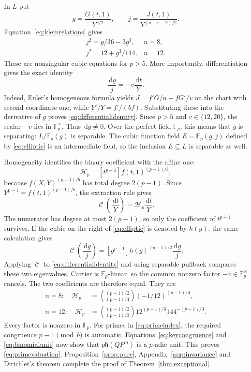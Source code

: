 \documentclass[11pt]{article}
\numberwithin{equation}{section}
\theoremstyle{definition}
\theoremstyle{remark}
\newcommand{\Fp}{\mathbb F_p}
\newcommand{\dd}{\,\mathrm d}
\newcommand{\h}{\mathsf h}
\DeclareMathOperator{\Cart}{\mathcal C}
\begin{document}
In $L$ put
\[
 g=\frac{G(t,1)}{Y^{v/2}},\qquad
 j=\frac{J(t,1)}{Y^{(n+v-2)/2}}.
\]
Equation~\eqref{eq:kleinrelations} gives
\begin{equation}\label{eq:elliptic}
 \begin{array}{ll}
 j^2=g/36-3g^3,&n=8,\\
 j^2=12+g^3/144,&n=12.
 \end{array}
\end{equation}
These are nonsingular cubic equations for $p>5$. More importantly,
differentiation gives the exact identity
\begin{equation}\label{eq:differentialidentity}
 \frac{\dd g}{j}=-v\frac{\dd t}{Y}.
\end{equation}
Indeed, Euler's homogeneous formula yields
$J=f'G/n-fG'/v$ on the chart with second coordinate one, while
$Y'/Y=f'/(bf)$. Substituting these into the derivative of $g$ proves
\eqref{eq:differentialidentity}. Since $p>5$ and $v\in\{12,20\}$,
the scalar $-v$ lies in $\Fp^\times$. Thus $\dd g\ne0$.
Over the perfect field $\Fp$, this means that $g$ is separating:
$L/\Fp(g)$ is separable. The cubic function field
$E=\Fp(g,j)$ defined by \eqref{eq:elliptic} is an intermediate field,
so the inclusion $E\subseteq L$ is separable as well.

Homogeneity identifies the binary coefficient with the affine one:
\[
 \mathcal H_p=[t^{p-1}]f(t,1)^{(p-1)/b},
\]
because $f(X,Y)^{(p-1)/b}$ has total degree $2(p-1)$.
Since $Y^{p-1}=f(t,1)^{(p-1)/b}$, the extraction rule gives
\[
 \Cart\left(\frac{\dd t}{Y}\right)
 =\mathcal H_p\frac{\dd t}{Y}.
\]
The numerator has degree at most $2(p-1)$, so only the coefficient
of $t^{p-1}$ survives. If the cubic on the right of
\eqref{eq:elliptic} is denoted by $h(g)$, the same calculation gives
\[
 \Cart\left(\frac{\dd g}{j}\right)
 =[g^{p-1}]h(g)^{(p-1)/2}\frac{\dd g}{j}.
\]
Applying $\Cart$ to \eqref{eq:differentialidentity} and using separable
pullback compares these two eigenvalues. Cartier is $\Fp$-linear, so
the common nonzero factor $-v\in\Fp^\times$ cancels. The two
coefficients are therefore equal. They are
\begin{equation}\label{eq:hassevalues}
 \begin{aligned}
 n=8:\quad
 \mathcal H_p&=\binom{(p-1)/2}{(p-1)/4}
                     (-1/12)^{(p-1)/4},\\
 n=12:\quad
 \mathcal H_p&=\binom{(p-1)/2}{(p-1)/3}
                     12^{(p-1)/6}144^{-(p-1)/3}.
 \end{aligned}
\end{equation}
Every factor is nonzero in $\Fp$. For primes in
\eqref{eq:primeindex}, the required congruence $p\equiv1\pmod b$
is automatic. Equations~\eqref{eq:keycongruence} and
\eqref{eq:binomialunit} now show that $p\h(QP^m)$ is a $p$-adic unit.
This proves \eqref{eq:primevaluation}. Proposition~\ref{prop:pure},
Appendix~\ref{app:invariance} and Dirichlet's theorem complete the proof
of Theorem~\ref{thm:exceptional}.
\end{document}
